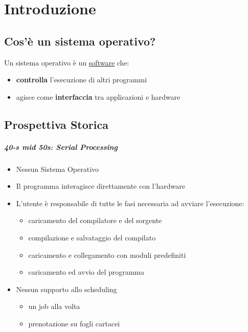 \section{Introduzione}
\subsection{Cos'è un sistema operativo?}
Un sistema operativo è un \underline{software} che: \begin{itemize}
\item \textbf{controlla} l'esecuzione di altri programmi
\item agisce come \textbf{interfaccia} tra applicazioni e hardware
\end{itemize}

\subsection{Prospettiva Storica}
\subparagraph{40-s mid 50s: Serial Processing}
\begin{itemize}
\item Nessun Sistema Operativo
\item Il programma interagisce direttamente con l'hardware
\item L'utente è responsabile di tutte le fasi necessaria ad avviare l'esecuzione:

\begin{itemize}
\item caricamento del compilatore e del sorgente
\item compilazione e salvataggio del compilato
\item caricamento e collegamento con moduli predefiniti
\item caricamento ed avvio del programma
\end{itemize}

\item Nessun supporto allo scheduling

\begin{itemize}
\item un job alla volta
\item prenotazione su fogli cartacei
\end{itemize}

\end{itemize}

